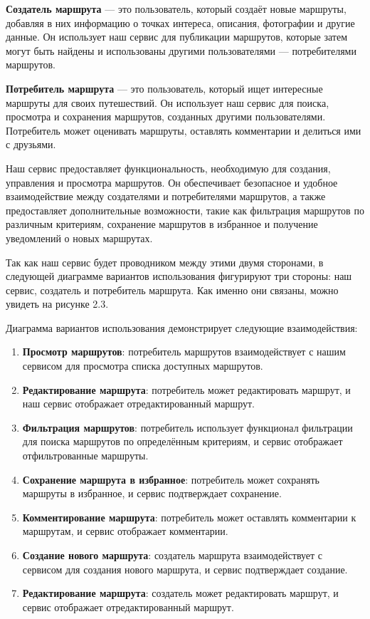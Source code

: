 \textbf{Создатель маршрута} — это пользователь, который создаёт новые маршруты, добавляя в них информацию о точках интереса, описания, фотографии и другие данные. Он использует наш сервис для публикации маршрутов, которые затем могут быть найдены и использованы другими пользователями — потребителями маршрутов.

\textbf{Потребитель маршрута} — это пользователь, который ищет интересные маршруты для своих путешествий. Он использует наш сервис для поиска, просмотра и сохранения маршрутов, созданных другими пользователями. Потребитель может оценивать маршруты, оставлять комментарии и делиться ими с друзьями.

Наш сервис предоставляет функциональность, необходимую для создания, управления и просмотра маршрутов. Он обеспечивает безопасное и удобное взаимодействие между создателями и потребителями маршрутов, а также предоставляет дополнительные возможности, такие как фильтрация маршрутов по различным критериям, сохранение маршрутов в избранное и получение уведомлений о новых маршрутах.

Так как наш сервис будет проводником между этими двумя сторонами, в следующей диаграмме вариантов использования фигурируют три стороны: наш сервис, создатель и потребитель маршрута. Как именно они связаны, можно увидеть на рисунке 2.3.

Диаграмма вариантов использования демонстрирует следующие взаимодействия:

\begin{enumerate}
    \item \textbf{Просмотр маршрутов}: потребитель маршрутов взаимодействует с нашим сервисом для просмотра списка доступных маршрутов.
    \item \textbf{Редактирование маршрута}: потребитель может редактировать маршрут, и наш сервис отображает отредактированный маршрут.
    \item \textbf{Фильтрация маршрутов}: потребитель использует функционал фильтрации для поиска маршрутов по определённым критериям, и сервис отображает отфильтрованные маршруты.
    \item \textbf{Сохранение маршрута в избранное}: потребитель может сохранять маршруты в избранное, и сервис подтверждает сохранение.
    \item \textbf{Комментирование маршрута}: потребитель может оставлять комментарии к маршрутам, и сервис отображает комментарии.
    \item \textbf{Создание нового маршрута}: создатель маршрута взаимодействует с сервисом для создания нового маршрута, и сервис подтверждает создание.
    \item \textbf{Редактирование маршрута}: создатель может редактировать маршрут, и сервис отображает отредактированный маршрут.
\end{enumerate}

